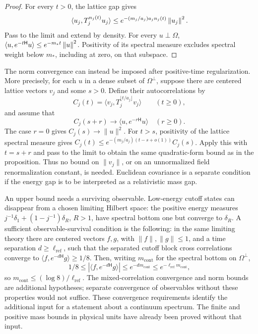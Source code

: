 \begin{proof}
For every $t>0$, the lattice gap gives
\[
 \langle u_j,T_j^{n_j(t)}u_j\rangle
 \le e^{-(m_j/a_j)a_jn_j(t)}\left\lVert u_j\right\rVert^2.
\]
Pass to the limit and extend by density. For every $u\perp\Omega$,
$\langle u,e^{-t\mathsf H}u\rangle\le e^{-m_*t}\left\lVert u\right\rVert^2$.
Positivity of its spectral measure excludes spectral weight below
$m_*$, including at zero, on that subspace.
\end{proof}

The norm convergence can instead be imposed after positive-time
regularization. More precisely, for each $u$ in a dense subset of
$\Omega^\perp$, suppose there are centered lattice vectors $v_j$ and
some $s>0$. Define their autocorrelations by
\[
 C_j(t)=\langle v_j,T_j^{\lfloor t/a_j\rfloor}v_j\rangle
 \qquad(t\ge0),
\]
and assume that
\[
 C_j(s+r)\longrightarrow\langle u,e^{-r\mathsf H}u\rangle
 \quad(r\ge0).
\]
The case $r=0$ gives $C_j(s)\to\|u\|^2$. For $t>s$, positivity of
the lattice spectral measure gives
$C_j(t)\le e^{-(m_j/a_j)(t-s+o(1))}C_j(s)$.
Apply this with $t=s+r$ and pass to the limit to obtain the same
quadratic-form bound as in the proposition. Thus no bound on
$\|v_j\|$, or on an unnormalized field renormalization constant,
is needed. Euclidean covariance is a separate condition if the energy
gap is to be interpreted as a relativistic mass gap.

An upper bound needs a surviving observable. Low-energy cutoff states
can disappear from a chosen limiting Hilbert space: the positive energy
measures $j^{-1}\delta_1+(1-j^{-1})\delta_R$, $R>1$, have spectral
bottom one but converge to $\delta_R$. A sufficient observable-survival condition is the following: in the
same limiting theory there are centered vectors $f,g$, with
$\|f\|,\|g\|\le1$, and a time separation $d\ge\ell_{\mathrm{ref}}$,
such that the separated cutoff block cross correlations converge to
$\langle f,e^{-d\mathsf H}g\rangle\ge1/8$. Then, writing
$m_{\mathrm{cont}}$ for the spectral bottom on $\Omega^\perp$,
\[
 1/8\le |\langle f,e^{-d\mathsf H}g\rangle|
 \le e^{-dm_{\mathrm{cont}}}
 \le e^{-\ell_{\mathrm{ref}}m_{\mathrm{cont}}},
\]
so $m_{\mathrm{cont}}\le(\log8)/\ell_{\mathrm{ref}}$.
The mixed-correlation convergence and norm bounds are additional
hypotheses; separate convergence of observables without these properties
would not suffice. These convergence requirements identify the
additional input for a statement about a continuum spectrum. The
finite and positive mass bounds in physical units have already been
proved without that input.
